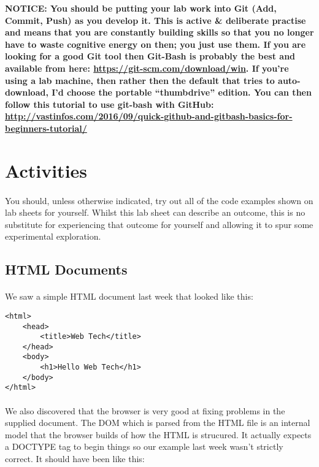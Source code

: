 \documentclass[10pt, a4paper]{article}
\begin{document}
\begin{framed}
{\bf{NOTICE:} You should be putting your lab work into Git (Add, Commit, Push) as you develop it. This is active \& deliberate practise and means that you are constantly building skills so that you no longer have to waste cognitive energy on then; you just use them. If you are looking for a good Git tool then Git-Bash is probably the best and available from here: \url{https://git-scm.com/download/win}. If you're using a lab machine, then rather then the default that tries to auto-download, I'd choose the portable ``thumbdrive'' edition. You can then follow this tutorial to use git-bash with GitHub: \url{http://vastinfos.com/2016/09/quick-github-and-gitbash-basics-for-beginners-tutorial/} }
\end{framed}


\section{Activities}

\paragraph{} You should, unless otherwise indicated, try out all of the code examples shown on lab sheets for yourself. Whilst this lab sheet can describe an outcome, this is no substitute for experiencing that outcome for yourself and allowing it to spur some experimental exploration.

\subsection{HTML Documents}
\paragraph{} We saw a simple HTML document last week that looked like this:

\begin{lstlisting}
<html>
    <head>
        <title>Web Tech</title>
    </head>
    <body>
        <h1>Hello Web Tech</h1>
    </body>
</html>
\end{lstlisting}

\paragraph{} We also discovered that the browser is very good at fixing problems in the supplied document. The DOM which is parsed from the HTML file is an internal model that the browser builds of how the HTML is strucured. It actually expects a DOCTYPE tag to begin things so our example last week wasn't strictly correct. It should have been like this:
\end{document}
